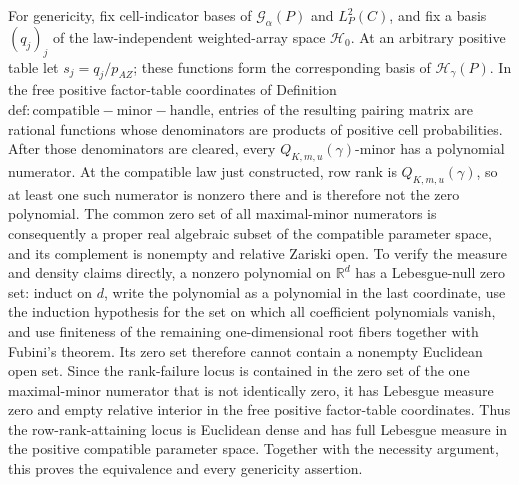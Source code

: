 For genericity, fix cell-indicator bases of \(\mathcal G_\alpha(P)\) and \(L_P^2(C)\), and fix a basis \((q_j)_j\) of the law-independent weighted-array space \(\mathcal H_0\). At an arbitrary positive table let \(s_j=q_j/p_{AZ}\); these functions form the corresponding basis of \(\mathcal H_\gamma(P)\). In the free positive factor-table coordinates of Definition \(\mathrm{def:compatible-minor-handle}\), entries of the resulting pairing matrix are rational functions whose denominators are products of positive cell probabilities. After those denominators are cleared, every \(Q_{K,m,u}(\gamma)\)-minor has a polynomial numerator. At the compatible law just constructed, row rank is \(Q_{K,m,u}(\gamma)\), so at least one such numerator is nonzero there and is therefore not the zero polynomial. The common zero set of all maximal-minor numerators is consequently a proper real algebraic subset of the compatible parameter space, and its complement is nonempty and relative Zariski open. To verify the measure and density claims directly, a nonzero polynomial on \(\mathbb R^d\) has a Lebesgue-null zero set: induct on \(d\), write the polynomial as a polynomial in the last coordinate, use the induction hypothesis for the set on which all coefficient polynomials vanish, and use finiteness of the remaining one-dimensional root fibers together with Fubini's theorem. Its zero set therefore cannot contain a nonempty Euclidean open set. Since the rank-failure locus is contained in the zero set of the one maximal-minor numerator that is not identically zero, it has Lebesgue measure zero and empty relative interior in the free positive factor-table coordinates. Thus the row-rank-attaining locus is Euclidean dense and has full Lebesgue measure in the positive compatible parameter space. Together with the necessity argument, this proves the equivalence and every genericity assertion.